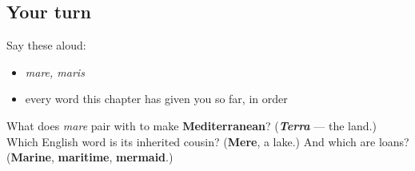 \subsection*{Your turn}
Say these aloud:

\begin{itemize}
\raggedright
  \item \emph{mare, maris}
  \item every word this chapter has given you so far, in order
\end{itemize}

\begin{tcolorbox}[breakable,colback=teal!4,colframe=teal!35!black,title={Before you move on}]
What does \emph{mare} pair with to make \textbf{Mediterranean}? (\emph{\textbf{Terra}} — the land.) Which English word is its inherited cousin? (\textbf{Mere}, a lake.) And which are loans? (\textbf{Marine}, \textbf{maritime}, \textbf{mermaid}.)
\end{tcolorbox}
